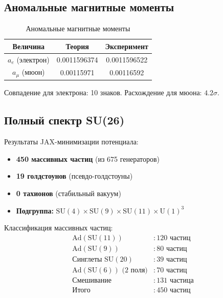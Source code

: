 \documentclass[12pt,a4paper,twoside]{article}
\newcommand{\SU}{\mathrm{SU}}
\newcommand{\Uone}{\mathrm{U}(1)}
\newcommand{\Ad}{\mathrm{Ad}}
\theoremstyle{definition}
\begin{document}
\subsection{Аномальные магнитные моменты}

\begin{table}[H]
\centering
\small
\caption{Аномальные магнитные моменты}
\label{tab:gm2}
\begin{tabular}{c|c|c}
\toprule
\textbf{Величина} & \textbf{Теория} & \textbf{Эксперимент} \\
\midrule
$a_e$ (электрон) & 0.0011596374 & 0.0011596522 \\
$a_\mu$ (мюон) & 0.00115971 & 0.00116592 \\
\bottomrule
\end{tabular}
\end{table}

Совпадение для электрона: 10 знаков. Расхождение для мюона: $4.2\sigma$.

\subsection{Полный спектр SU(26)}

Результаты JAX-минимизации потенциала:

\begin{itemize}
    \item \textbf{450 массивных частиц} (из 675 генераторов)
    \item \textbf{19 голдстоунов} (псевдо-голдстоуны)
    \item \textbf{0 тахионов} (стабильный вакуум)
    \item \textbf{Подгруппа:} $\SU(4) \times \SU(9) \times \SU(11) \times \Uone^3$
\end{itemize}

Классификация массивных частиц:
\begin{equation}
\begin{aligned}
\Ad(\SU(11)) &: 120 \text{ частиц} \\
\Ad(\SU(9)) &: 80 \text{ частиц} \\
\text{Синглеты } \SU(20) &: 39 \text{ частиц} \\
\Ad(\SU(6)) \text{ (2 поля)} &: 70 \text{ частиц} \\
\text{Смешивание} &: 131 \text{ частица} \\
\text{Итого} &: 450 \text{ частиц}
\end{aligned}
\end{equation}
\end{document}
